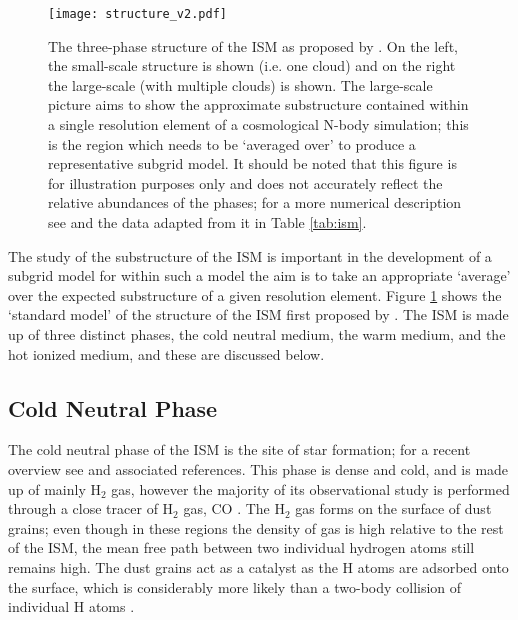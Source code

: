 \begin{figure}[ht]
    \centering

    \texttt{[image: structure\_v2.pdf]}

    \caption{The three-phase structure of the ISM as proposed by \citet{mckee_theory_1977}.
        On the left, the small-scale structure is shown (i.e. one cloud) and on the right the large-scale (with multiple clouds) is shown.
        The large-scale picture aims to show the approximate substructure contained within a single resolution element of a cosmological N-body simulation; this is the region which needs to be `averaged over' to produce a representative subgrid model.
    It should be noted that this figure is for illustration purposes only and does not accurately reflect the relative abundances of the phases; for a more numerical description see \citet{ferriere_interstellar_2001} and the data adapted from it in Table \ref{tab:ism}.}
    \label{fig:struct}
\end{figure}

The study of the substructure of the ISM is important in the development of a subgrid model for within such a model the aim is to take an appropriate `average' over the expected substructure of a given resolution element.
Figure \ref{fig:struct} shows the `standard model' of the structure of the ISM first proposed by \citet{mckee_theory_1977}.
The ISM is made up of three distinct phases, the cold neutral medium, the warm medium, and the hot ionized medium, and these are discussed below.

\subsection{Cold Neutral Phase}

The cold neutral phase of the ISM is the site of star formation; for a recent overview see \citet{mckee_theory_2007} and associated references.
This phase is dense and cold, and is made up of mainly H$_2$ gas, however the majority of its observational study is performed through a close tracer of H$_2$ gas, CO \citep{ferriere_interstellar_2001}.
The H$_2$ gas forms on the surface of dust grains; even though in these regions the density of gas is high relative to the rest of the ISM, the mean free path between two individual hydrogen atoms still remains high.
The dust grains act as a catalyst as the H atoms are adsorbed onto the surface, which is considerably more likely than a two-body collision of individual H atoms \citep{gould_interstellar_1963}.

